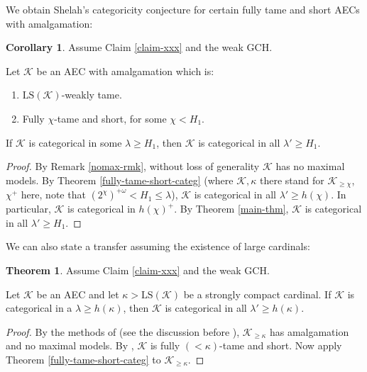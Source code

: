 \documentclass[12pt]{amsart}
\theoremstyle{definition}
\newtheorem{thm}[mydef]{Theorem}
\newtheorem{cor}[mydef]{Corollary}
\begin{document}
We obtain Shelah's categoricity conjecture for certain fully tame and short AECs with amalgamation: 

\begin{cor}
  Assume Claim \ref{claim-xxx} and the weak GCH.
  
  Let ${\mathcal{K}}$ be an AEC with amalgamation which is:

  \begin{enumerate}
    \item ${\text{LS}} ({\mathcal{K}})$-weakly tame.
    \item Fully $\chi$-tame and short, for some $\chi < H_1$.
  \end{enumerate}

  If ${\mathcal{K}}$ is categorical in some $\lambda \ge H_1$, then ${\mathcal{K}}$ is categorical in all $\lambda' \ge H_1$. 
\end{cor}
\begin{proof}
  By Remark \ref{nomax-rmk}, without loss of generality ${\mathcal{K}}$ has no maximal models. By Theorem \ref{fully-tame-short-categ} (where ${\mathcal{K}}, \kappa$ there stand for ${\mathcal{K}}_{\ge \chi}$, $\chi^+$ here, note that $\left(2^{\chi}\right)^{+\omega} < H_1 \le \lambda$), ${\mathcal{K}}$ is categorical in all $\lambda' \ge {h ({\chi})}$. In particular, ${\mathcal{K}}$ is categorical in ${h ({\chi})}^+$. By Theorem \ref{main-thm}, ${\mathcal{K}}$ is categorical in all $\lambda' \ge H_1$.
\end{proof}

We can also state a transfer assuming the existence of large cardinals:

\begin{thm}
  Assume Claim \ref{claim-xxx} and the weak GCH.

  Let ${\mathcal{K}}$ be an AEC and let $\kappa > {\text{LS}} ({\mathcal{K}})$ be a strongly compact cardinal. If ${\mathcal{K}}$ is categorical in a $\lambda \ge {h ({\kappa})}$, then ${\mathcal{K}}$ is categorical in all $\lambda' \ge {h ({\kappa})}$.
\end{thm}
\begin{proof}
  By the methods of \cite{makkaishelah} (see the discussion before \cite[Proposition 7.3]{tamelc-jsl}), ${\mathcal{K}}_{\ge \kappa}$ has amalgamation and no maximal models. By \cite[Theorem 4.5]{tamelc-jsl}, ${\mathcal{K}}$ is fully $(<\kappa)$-tame and short. Now apply Theorem \ref{fully-tame-short-categ} to ${\mathcal{K}}_{\ge \kappa}$.
\end{proof}
\end{document}
